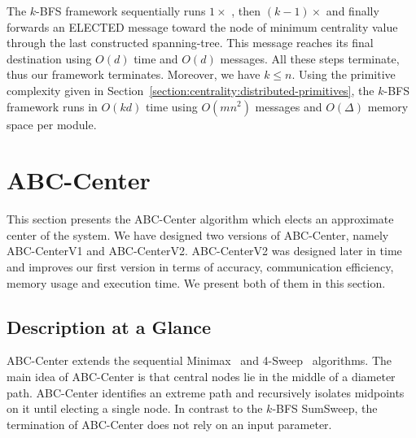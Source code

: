 The $k$-BFS framework sequentially runs $1 \times $ \cheungIeCbAgg{}, then $(k-1)\times$ \cheungCbAgg{} and finally forwards an ELECTED message toward the node of minimum centrality value through the last constructed spanning-tree. This message reaches its final destination using $O(d)$ time and $O(d)$ messages. All these steps terminate, thus our framework terminates. Moreover, we have $k \leq n$. Using the primitive complexity given in Section~\ref{section:centrality:distributed-primitives}, the $k$-BFS framework runs in $O(kd)$ time using $O(mn^2)$ messages and $O(\Delta)$ memory space per module.

\section{ABC-Center}
\label{section:centrality:abc-center}

This section presents the ABC-Center algorithm which elects an approximate center of the system. We have designed two versions of ABC-Center, namely ABC-CenterV1 and ABC-CenterV2. ABC-CenterV2 was designed later in time and improves our first version in terms of accuracy, communication efficiency, memory usage and execution time. We present both of them in this section.

\subsection{Description at a Glance}

ABC-Center extends the sequential Minimax~\cite{handler1973minimax} and 4-Sweep~\cite{crescenzi2013computing} algorithms. The main idea of ABC-Center is that central nodes lie in the middle of a diameter path. ABC-Center identifies an extreme path and recursively isolates midpoints on it until electing a single node. In contrast to the $k$-BFS SumSweep, the termination of ABC-Center does not rely on an input parameter.

